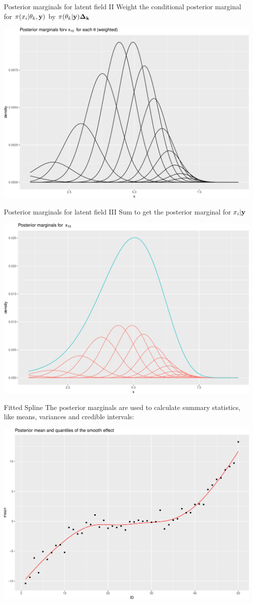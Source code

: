 \documentclass[
  ignorenonframetext,
]{beamer}
\begin{document}
\begin{frame}{Posterior marginals for latent field II}
\protect\hypertarget{posterior-marginals-for-latent-field-ii}{}
Weight the conditional posterior marginal for
\(\pi(x_i|\theta_k, \bf{y})\) by \(\pi(\theta_k|\bf{y})\Delta_k\)

\begin{center}\includegraphics[width=0.6\linewidth]{Part1_intro_files/figure-beamer/unnamed-chunk-14-1} \end{center}
\end{frame}

\begin{frame}{Posterior marginals for latent field III}
\protect\hypertarget{posterior-marginals-for-latent-field-iii}{}
Sum to get the posterior marginal for \(x_i|\bf{y}\)

\begin{center}\includegraphics[width=0.6\linewidth]{Part1_intro_files/figure-beamer/unnamed-chunk-15-1} \end{center}
\end{frame}

\begin{frame}{Fitted Spline}
\protect\hypertarget{fitted-spline}{}
The posterior marginals are used to calculate summary statistics, like
means, variances and credible intervals:

\begin{center}\includegraphics[width=0.6\linewidth]{Part1_intro_files/figure-beamer/unnamed-chunk-16-1} \end{center}
\end{frame}
\end{document}
